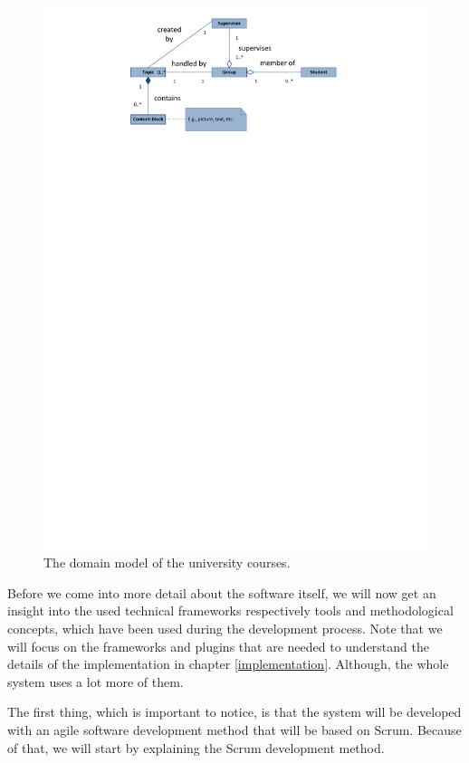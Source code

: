 \begin{figure}[th]
\centerline{\includegraphics[width=1\textwidth]{gfx/domainModel.pdf}}
\caption{The domain model of the university courses.}
\label{domain}
\end{figure}

Before we come into more detail about the software itself, we will now get an insight into the used technical frameworks respectively tools and methodological concepts, which have been used during the development process.  Note that we will focus on the frameworks and plugins that are needed to understand the details of the implementation in chapter \ref{implementation}. Although, the whole system uses a lot more of them.

The first thing, which is important to notice, is that the system will be developed with an agile software development method that will be based on Scrum. Because of that, we will start by explaining the Scrum development method.

